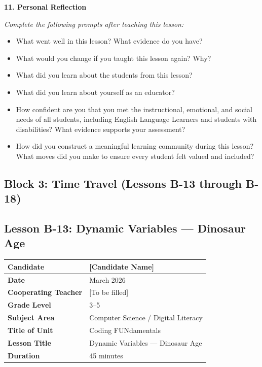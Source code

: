 \documentclass[11pt,letterpaper]{article}
\begin{document}
\textbf{11. Personal Reflection}

\textit{Complete the following prompts after teaching this lesson:}

\begin{itemize}
  \item What went well in this lesson? What evidence do you have?

  \item What would you change if you taught this lesson again? Why?

  \item What did you learn about the students from this lesson?

  \item What did you learn about yourself as an educator?

  \item How confident are you that you met the instructional, emotional, and social needs of all students, including English Language Learners and students with disabilities? What evidence supports your assessment?

  \item How did you construct a meaningful learning community during this lesson? What moves did you make to ensure every student felt valued and included?
\end{itemize}

\newpage
\subsection{Block 3: Time Travel (Lessons B-13 through B-18)}
\label{sub:Block3TimeTravelLessonsB13throughB18}

\subsection{Lesson B-13: Dynamic Variables --- Dinosaur Age}
\label{sub:LessonB13DynamicVariablesDinosaurAge}

\begin{longtable}{|L{0.28\textwidth}|L{0.65\textwidth}|}
\hline
\textbf{Candidate}  & [Candidate Name]  \\
\hline
\textbf{Date}  & March 2026  \\
\hline
\textbf{Cooperating Teacher}  & [To be filled]  \\
\hline
\textbf{Grade Level}  & 3--5  \\
\hline
\textbf{Subject Area}  & Computer Science / Digital Literacy  \\
\hline
\textbf{Title of Unit}  & Coding FUNdamentals  \\
\hline
\textbf{Lesson Title}  & Dynamic Variables --- Dinosaur Age  \\
\hline
\textbf{Duration}  & 45 minutes  \\
\hline
\end{longtable}
\end{document}
